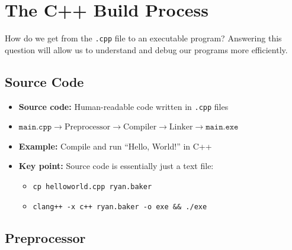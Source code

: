 \documentclass{article}
\begin{document}
\section{The C++ Build Process}

\noindent
How do we get from the \texttt{.cpp} file to an executable program? Answering this question will allow us to understand and debug our programs more efficiently.

\subsection{Source Code}

\begin{itemize}
	\item \textbf{Source code:} Human-readable code written in \texttt{.cpp} files
	\item $\texttt{main.cpp}\rightarrow\boxed{\textrm{Preprocessor}}\rightarrow\boxed{\textrm{Compiler}}\rightarrow\boxed{\textrm{Linker}}\rightarrow\texttt{main.exe}$
	\item \textbf{Example:} Compile and run ``Hello, World!'' in C++
	\item \textbf{Key point:} Source code is essentially just a text file: \begin{itemize}
		\item \texttt{cp helloworld.cpp ryan.baker}
		\item \texttt{clang++ -x c++ ryan.baker -o exe \&\& ./exe}
	\end{itemize}
\end{itemize}

\subsection{Preprocessor}
\end{document}
